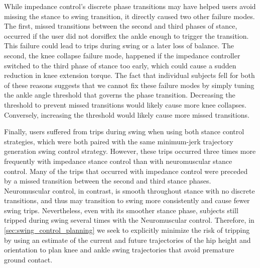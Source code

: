 \begin{comment}
One possible important difference between the
implemented neuromuscular and impedance control strategies was that impedance
control typically provided much more ankle push of work, as shown in
\cref{fig:treadmill_exp_ankle_work}. In impedance control, the transition
transition to the third phase of gait generates a large burst of ankle power,
which users may interpret as a signal that the prosthesis is ready to enter
swing. In contrast, neuromuscular control may not have provided any such signal
due to the lack of ankle work. It is possible that such cues to the user should
be explicitly considered in the design of prosthesis controllers, especially
when they can help inform correct transition of discrete state.
\begin{marginfigure}
    \centering 
    \missingfigure[figwidth=\textwidth]{ankle work}
    \caption{Normal Walking, impedance and neuromuscular control ankle
    work.}\label{fig:treadmill_exp_ankle_work}
\end{marginfigure}
\end{comment}

While impedance control's discrete phase transitions may have helped users avoid
missing the stance to swing transition, it directly caused two other failure
modes. The first, missed transitions between the second and third phases of
stance, occurred if the user did not dorsiflex the ankle enough to trigger the
transition. This failure could lead to trips during swing or a later loss of
balance. The second, the knee collapse failure mode, happened if the impedance
controller switched to the third phase of stance too early, which could cause a
sudden reduction in knee extension torque. The fact that individual subjects
fell for both of these reasons suggests that we cannot fix these failure modes
by simply tuning the ankle angle threshold that governs the phase transition.
Decreasing the threshold to prevent missed transitions would likely cause more
knee collapses. Conversely, increasing the threshold would likely cause more
missed transitions. 

Finally, users suffered from trips during swing when using both stance control
strategies, which were both paired with the same minimum-jerk trajectory
generation swing control strategy. However, these trips occurred three times
more frequently with impedance stance control than with neuromuscular stance
control. Many of the trips that occurred with impedance control were preceded by
a missed transition between the second and third stance phases. Neuromuscular
control, in contrast, is smooth throughout stance with no discrete transitions,
and thus may transition to swing more consistently and cause fewer swing trips.
Nevertheless, even with its smoother stance phase, subjects still tripped during
swing several times with the Neuromuscular control. Therefore, in
\cref{sec:swing_control_planning} we seek to explicitly minimize the risk of
tripping by using an estimate of the current and future trajectories of the hip
height and orientation to plan knee and ankle swing trajectories that avoid
premature ground contact.

